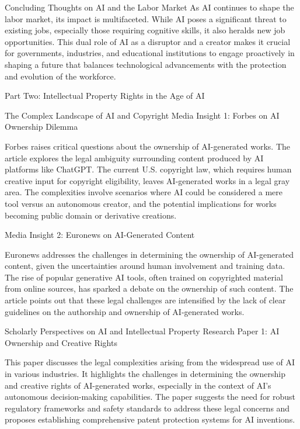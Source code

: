 \documentclass[11pt]{article}
\begin{document}
Concluding Thoughts on AI and the Labor Market
As AI continues to shape the labor market, its impact is multifaceted. While AI poses a significant threat to existing jobs, especially those requiring cognitive skills, it also heralds new job opportunities. This dual role of AI as a disruptor and a creator makes it crucial for governments, industries, and educational institutions to engage proactively in shaping a future that balances technological advancements with the protection and evolution of the workforce.

Part Two: Intellectual Property Rights in the Age of AI

The Complex Landscape of AI and Copyright
Media Insight 1: Forbes on AI Ownership Dilemma

Forbes raises critical questions about the ownership of AI-generated works. The article explores the legal ambiguity surrounding content produced by AI platforms like ChatGPT. The current U.S. copyright law, which requires human creative input for copyright eligibility, leaves AI-generated works in a legal gray area. The complexities involve scenarios where AI could be considered a mere tool versus an autonomous creator, and the potential implications for works becoming public domain or derivative creations.

Media Insight 2: Euronews on AI-Generated Content

Euronews addresses the challenges in determining the ownership of AI-generated content, given the uncertainties around human involvement and training data. The rise of popular generative AI tools, often trained on copyrighted material from online sources, has sparked a debate on the ownership of such content. The article points out that these legal challenges are intensified by the lack of clear guidelines on the authorship and ownership of AI-generated works.

Scholarly Perspectives on AI and Intellectual Property
Research Paper 1: AI Ownership and Creative Rights

This paper discusses the legal complexities arising from the widespread use of AI in various industries. It highlights the challenges in determining the ownership and creative rights of AI-generated works, especially in the context of AI's autonomous decision-making capabilities. The paper suggests the need for robust regulatory frameworks and safety standards to address these legal concerns and proposes establishing comprehensive patent protection systems for AI inventions.
\end{document}
